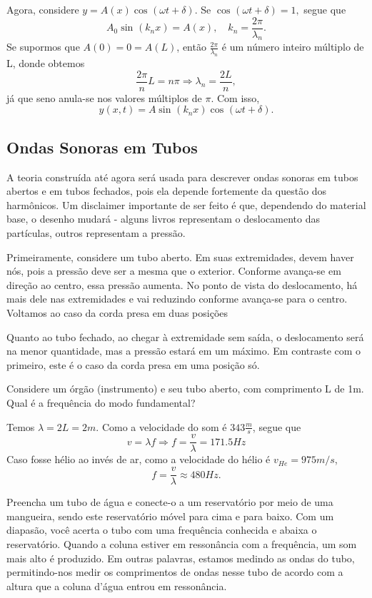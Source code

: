 \documentclass[physicsII_notes.tex]{subfiles}
\begin{document}
Agora, considere \(y = A(x)\cos^{}{(\omega t + \delta )}\). Se \(\cos^{}{(\omega t + \delta )}=1,\) segue que
\[
	A_{0}\sin^{}{(k_{n}x)} = A(x),\quad k_{n} = \frac{2\pi }{\lambda_{n}}.
\]
Se supormos que \(A(0) = 0 = A(L)\), então \(\frac{2\pi }{\lambda_{n}}\) é um número inteiro múltiplo de L, donde obtemos
\[
	\frac{2\pi }{n}L = n\pi \Rightarrow \lambda_{n} = \frac{2L}{n},
\]
já que seno anula-se nos valores múltiplos de \(\pi \). Com isso,
\[
	y(x, t) = A\sin^{}{(k_{n}x)}\cos^{}{(\omega t + \delta )}.
\]
\subsection{Ondas Sonoras em Tubos}
A teoria construída até agora será usada para descrever ondas sonoras em tubos abertos e em tubos fechados, pois ela depende fortemente
da questão dos harmônicos. Um disclaimer importante de ser feito é que, dependendo do material base, o desenho mudará - alguns livros representam
o deslocamento das partículas, outros representam a pressão.

Primeiramente, considere um tubo aberto. Em suas extremidades, devem haver nós, pois a pressão deve ser a mesma que o exterior. Conforme avança-se
em direção ao centro, essa pressão aumenta. No ponto de vista do deslocamento, há mais dele nas extremidades e vai reduzindo conforme avança-se para o
centro. Voltamos ao caso da corda presa em duas posições

Quanto ao tubo fechado, ao chegar à extremidade sem saída, o deslocamento será na menor quantidade, mas a pressão estará em um máximo.
Em contraste com o primeiro, este é o caso da corda presa em uma posição só.
\begin{example}
	Considere um órgão (instrumento) e seu tubo aberto, com comprimento L de 1m. Qual é a frequência do modo fundamental?

	Temos \(\lambda  = 2L = 2m. \) Como a velocidade do som é \(343 \frac{m}{s}\), segue que
	\[
		v = \lambda f \Rightarrow f = \frac{v}{\lambda } = 171.5 Hz
	\]
	Caso fosse hélio ao invés de ar, como a velocidade do hélio é \(v_{He} = 975m/s\),
	\[
		f = \frac{v}{\lambda } \approx 480Hz.
	\]
\end{example}
Preencha um tubo de água e conecte-o a um reservatório por meio de uma mangueira, sendo este reservatório móvel para cima e para baixo. Com um diapasão,
você acerta o tubo com uma frequência conhecida e abaixa o reservatório. Quando a coluna estiver em ressonância com a frequência, um som mais alto é produzido.
Em outras palavras, estamos medindo as ondas do tubo, permitindo-nos medir os comprimentos de ondas nesse tubo de acordo com a altura que a coluna d'água entrou em ressonância.
\end{document}
